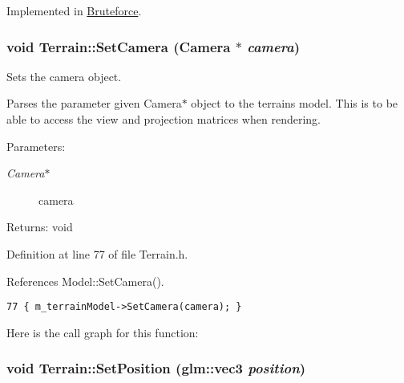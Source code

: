 Implemented in \hyperlink{class_bruteforce_910463356742edd6703a19b46f4ed359}{Bruteforce}.\hypertarget{class_terrain_d24a0b962c0bff2328d45c716a4b2788}{
\subsubsection[SetCamera]{\setlength{\rightskip}{0pt plus 5cm}void Terrain::SetCamera ({\bf Camera} $\ast$ {\em camera})}}
\label{class_terrain_d24a0b962c0bff2328d45c716a4b2788}


Sets the camera object. 

Parses the parameter given Camera$\ast$ object to the terrains model. This is to be able to access the view and projection matrices when rendering.

\begin{Desc}
\item[Parameters:]
\begin{description}
\item[{\em Camera$\ast$}]camera \end{description}
\end{Desc}
\begin{Desc}
\item[Returns:]void \end{Desc}


Definition at line 77 of file Terrain.h.

References Model::SetCamera().

\begin{Code}\begin{verbatim}77 { m_terrainModel->SetCamera(camera); }
\end{verbatim}
\end{Code}




Here is the call graph for this function:\hypertarget{class_terrain_33990e5363ba3dc351abd313c2832edb}{
\subsubsection[SetPosition]{\setlength{\rightskip}{0pt plus 5cm}void Terrain::SetPosition ({\bf glm::vec3} {\em position})}}
\label{class_terrain_33990e5363ba3dc351abd313c2832edb}


